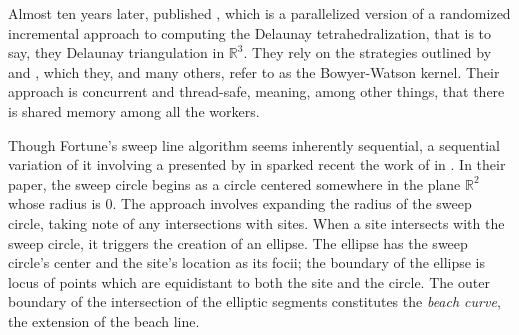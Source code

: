 \documentclass[12pt,twoside]{reedthesis}
\begin{document}
    Almost ten years later, \citeauthor{blelloch3d} published , which is a parallelized version of a randomized incremental approach to computing the Delaunay tetrahedralization, that is to say, they Delaunay triangulation in $\mathds{R}^3$. They rely on the strategies outlined by \textcite{bowyer} and \textcite{watson}, which they, and many others, refer to as the Bowyer-Watson kernel. Their approach is concurrent and thread-safe, meaning, among other things, that there is shared memory among all the workers. 

    Though Fortune's sweep line algorithm seems inherently sequential, a sequential variation of it involving a  presented by \textcite{klein} in \citeyear{klein} sparked recent the work of \citeauthor*{xin} in \citeyear{xin} \cite{xin}. In their paper, the sweep circle begins as a circle centered somewhere in the plane $\mathds{R}^2$ whose radius is 0. The approach involves expanding the radius of the sweep circle, taking note of any intersections with sites. When a site intersects with the sweep circle, it triggers the creation of an ellipse. The ellipse has the sweep circle's center and the site's location as its focii; the boundary of the ellipse is locus of points which are equidistant to both the site and the circle. The outer boundary of the intersection of the elliptic segments constitutes the \emph{beach curve}, the extension of the beach line. \par
\end{document}
